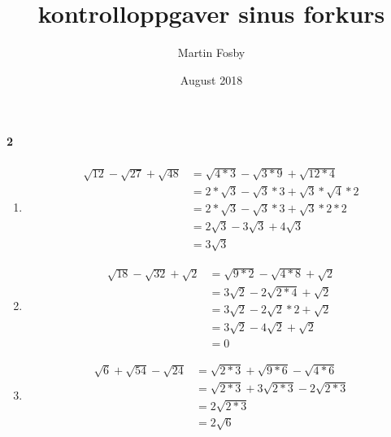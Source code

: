 \documentclass{article}
\title{kontrolloppgaver sinus forkurs}
\author{Martin Fosby}
\date{August 2018}
\newcommand\litem[1]{\item{\bfseries#1\space}}
\begin{document}
\maketitle
{}

\paragraph{2}
\begin{enumerate}[label=\emph{\alph*})]
\litem{
  \begin{align*}
    \sqrt{12} - \sqrt{27} + \sqrt{48} &= \sqrt{4 * 3} - \sqrt{3 * 9} + \sqrt{12 * 4} \\ 
    &= 2 * \sqrt{3} - \sqrt{3} * 3 + \sqrt{3} * \sqrt{4} * 2 \\
    &= 2 * \sqrt{3} - \sqrt{3} * 3 + \sqrt{3} * 2 * 2 \\
    &= 2\sqrt{3} - 3\sqrt{3} + 4\sqrt{3} \\
    &= 3\sqrt{3}
  \end{align*}
  }
\litem{
  \begin{align*}
    \sqrt{18} - \sqrt{32} + \sqrt{2} &= \sqrt{9 * 2} - \sqrt{4 * 8} + \sqrt{2} \\
    &= 3\sqrt{2} - 2\sqrt{2 * 4} + \sqrt{2} \\
    &= 3\sqrt{2} - 2\sqrt{2} * 2 + \sqrt{2} \\
    &= 3\sqrt{2} - 4\sqrt{2} + \sqrt{2} \\
    &= 0 
  \end{align*}
  }
\litem{
\begin{align*}
    \sqrt{6} + \sqrt{54} - \sqrt{24} &= \sqrt{2 * 3} + \sqrt{9 * 6} - \sqrt{4 * 6} \\
    &= \sqrt{2 * 3} + 3\sqrt{2 * 3} - 2\sqrt{2 * 3} \\
    &= 2\sqrt{2 * 3} \\
    &= 2\sqrt{6}
\end{align*}
}
\end{enumerate}
\end{document}
